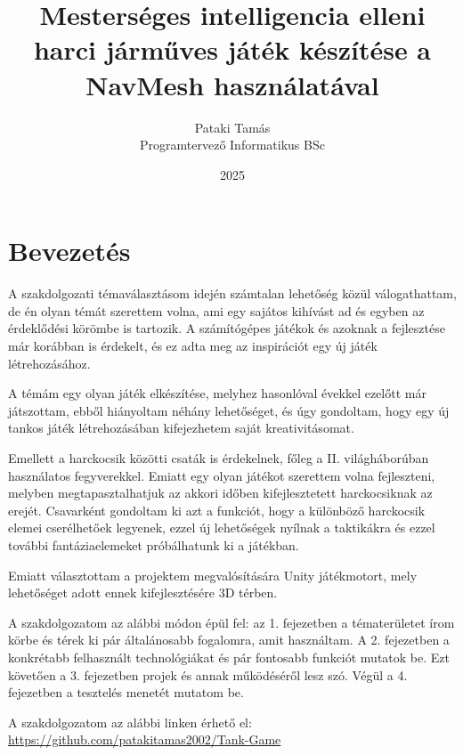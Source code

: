 \documentclass[
]{thesis-ekf}
\theoremstyle{definition}
\theoremstyle{remark}
\begin{document}
\title{Mesterséges intelligencia elleni harci járműves játék készítése a NavMesh használatával}
\author{Pataki Tamás\\Programtervező Informatikus BSc}
\date{2025}
\maketitle

\tableofcontents

\chapter*{Bevezetés}

A szakdolgozati témaválasztásom idején számtalan lehetőség közül válogathattam, de én olyan témát szerettem volna, ami egy sajátos kihívást ad és egyben az érdeklődési körömbe is tartozik. A számítógépes játékok és azoknak a fejlesztése már korábban is érdekelt, és ez adta meg az inspirációt egy új játék létrehozásához.

A témám egy olyan játék elkészítése, melyhez hasonlóval évekkel ezelőtt már játszottam, ebből hiányoltam néhány lehetőséget, és úgy gondoltam, hogy egy új tankos játék létrehozásában kifejezhetem saját kreativitásomat.

Emellett a harckocsik közötti csaták is érdekelnek, főleg a II. világháborúban használatos fegyverekkel. Emiatt egy olyan játékot szerettem volna fejleszteni, melyben megtapasztalhatjuk az akkori időben kifejlesztetett harckocsiknak az erejét. Csavarként gondoltam ki azt a funkciót, hogy a különböző harckocsik elemei cserélhetőek legyenek, ezzel új lehetőségek nyílnak a taktikákra és ezzel további fantáziaelemeket próbálhatunk ki a játékban.

Emiatt választottam a projektem megvalósítására Unity\cite{unity} játékmotort, mely lehetőséget adott ennek kifejlesztésére 3D térben.

A szakdolgozatom az alábbi módon épül fel: az 1. fejezetben a tématerületet írom körbe és térek ki pár általánosabb fogalomra, amit használtam. A 2. fejezetben a konkrétabb felhasznált technológiákat és pár fontosabb funkciót mutatok be. Ezt követően a 3. fejezetben projek és annak működéséről lesz szó. Végül a 4. fejezetben a tesztelés menetét mutatom be.

A szakdolgozatom az alábbi linken érhető el: \url{https://github.com/patakitamas2002/Tank-Game}
\end{document}
